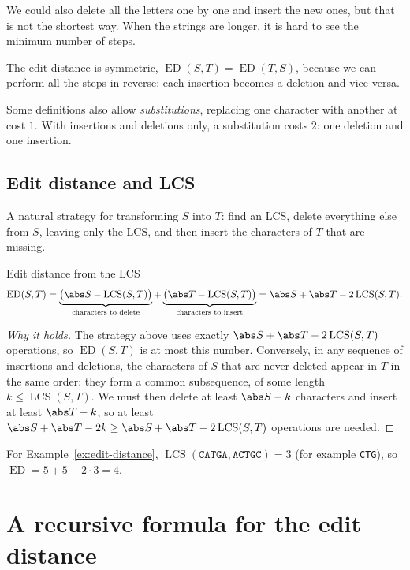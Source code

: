 \documentclass[a4paper,12pt,oneside]{report}
\newcommand{\ED}{\operatorname{ED}}
\newcommand{\LCS}{\operatorname{LCS}}
\begin{document}
We could also delete all the letters one by one and insert the new
ones, but that is not the shortest way. When the strings are longer,
it is hard to see the minimum number of steps.

The edit distance is symmetric, $\ED(S,T)=\ED(T,S)$, because we can
perform all the steps in reverse: each insertion becomes a deletion
and vice versa.

\begin{notebox}[Substitutions]
Some definitions also allow \emph{substitutions}, replacing one
character with another at cost $1$. With insertions and deletions
only, a substitution costs $2$: one deletion and one insertion.
\end{notebox}

\subsection{Edit distance and LCS}

A natural strategy for transforming $S$ into $T$: find an LCS, delete
everything else from $S$, leaving only the LCS, and then insert the
characters of $T$ that are missing.

\begin{framedprop}{Edit distance from the LCS}\label{prop:ed-lcs}
\[
  \ED(S,T)
  =\underbrace{\bigl(\abs S-\LCS(S,T)\bigr)}_{\text{characters to delete}}
  +\underbrace{\bigl(\abs T-\LCS(S,T)\bigr)}_{\text{characters to insert}}
  =\abs S+\abs T-2\LCS(S,T).
\]
\end{framedprop}

\begin{proof}[Why it holds]
The strategy above uses exactly $\abs S+\abs T-2\LCS(S,T)$ operations,
so $\ED(S,T)$ is at most this number. Conversely, in any sequence of
insertions and deletions, the characters of $S$ that are never deleted
appear in $T$ in the same order: they form a common subsequence, of
some length $k\leq\LCS(S,T)$. We must then delete at least $\abs S-k$
characters and insert at least $\abs T-k$, so at least
$\abs S+\abs T-2k\geq\abs S+\abs T-2\LCS(S,T)$ operations are needed.
\end{proof}

For Example~\ref{ex:edit-distance}, $\LCS(\texttt{CATGA},\texttt{ACTGC})=3$
(for example \texttt{CTG}), so $\ED=5+5-2\cdot3=4$.

\section{A recursive formula for the edit distance}
\end{document}
